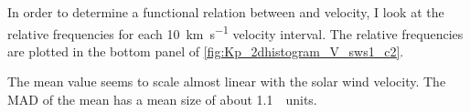 In order to determine a functional relation between \Kp{} and velocity, I look at the relative \Kp{} frequencies for each \SI{10}{\km\per\s} velocity interval. The relative frequencies are plotted in the bottom panel of \autoref{fig:Kp_2dhistogram_V_sws1_c2}.
\begin{figure}
\end{figure}
The mean \Kp{} value seems to scale almost linear with the solar wind velocity. The MAD of the mean has a mean size of about \SI{1.1}{\Kp~units}.

